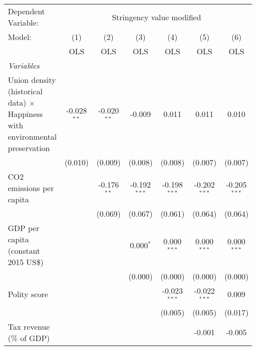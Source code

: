 
\begingroup
\centering
\begin{tabular}{lcccccc}
   \toprule
   Dependent Variable: & \multicolumn{6}{c}{Stringency value modified}\\
   Model:                                                                              & (1)           & (2)           & (3)            & (4)            & (5)            & (6)\\  
                                                                                       &  OLS          & OLS           & OLS            & OLS            & OLS            & OLS\\  
   \midrule
   \emph{Variables}\\
   Union density (historical data) $\times$ Happiness with environmental preservation  & -0.028$^{**}$ & -0.020$^{**}$ & -0.009         & 0.011          & 0.011          & 0.010\\   
                                                                                       & (0.010)       & (0.009)       & (0.008)        & (0.008)        & (0.007)        & (0.007)\\   
   CO2 emissions per capita                                                            &               & -0.176$^{**}$ & -0.192$^{***}$ & -0.198$^{***}$ & -0.202$^{***}$ & -0.205$^{***}$\\   
                                                                                       &               & (0.069)       & (0.067)        & (0.061)        & (0.064)        & (0.064)\\   
   GDP per capita (constant 2015 US\$)                                                 &               &               & 0.000$^{*}$    & 0.000$^{***}$  & 0.000$^{***}$  & 0.000$^{***}$\\   
                                                                                       &               &               & (0.000)        & (0.000)        & (0.000)        & (0.000)\\   
   Polity score                                                                        &               &               &                & -0.023$^{***}$ & -0.022$^{***}$ & 0.009\\   
                                                                                       &               &               &                & (0.005)        & (0.005)        & (0.017)\\   
   Tax revenue (\% of GDP)                                                             &               &               &                &                & -0.001         & -0.005\\   

\end{tabular}
